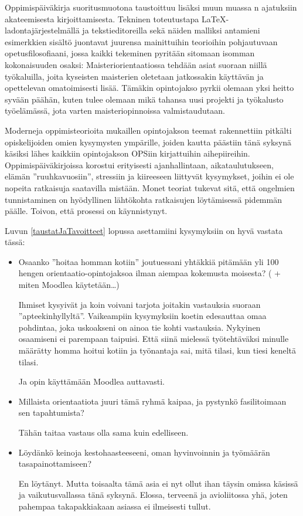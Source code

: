 \documentclass[utf8]{gradu3}
\begin{document}
Oppimispäiväkirja suoritusmuotona taustoittuu lisäksi muun muassa
\citeauthor{Badley2009shapingAndReshaping}n
\parencite*{Badley2009shapingAndReshaping} ajatuksiin akateemisesta
kirjoittamisesta. Tekninen toteutustapa \LaTeX -ladontajärjestelmällä ja
tekstieditoreilla sekä näiden malliksi antamieni esimerkkien sisältö juontavat
juurensa mainittuihin teorioihin pohjautuvaan opetusfilosofiaani, jossa kaikki
tekeminen pyritään sitomaan isomman kokonaisuuden osaksi: Maisteriorientaatiossa
tehdään asiat suoraan niillä työkaluilla, joita kyseisten maisterien oletetaan
jatkossakin käyttävän ja opettelevan omatoimisesti lisää. Tämäkin opintojakso
pyrkii olemaan yksi heitto syvään päähän, kuten tulee olemaan mikä tahansa uusi
projekti ja työkalusto työelämässä, jota varten maisteriopinnoissa
valmistaudutaan.

Moderneja oppimisteorioita mukaillen opintojakson teemat rakennettiin pitkälti
opiskelijoiden omien kysymysten ympärille, joiden kautta päästiin tänä syksynä
käsiksi lähes kaikkiin opintojakson OPSiin kirjattuihin aihepiireihin.
Oppimispäiväkirjoissa korostui erityisesti ajanhallintaan, aikataulutukseen,
elämän ''ruuhkavuosiin'', stressiin ja kiireeseen liittyvät kysymykset, joihin
ei ole nopeita ratkaisuja saatavilla mistään. Monet teoriat \parencite[edelleen
erityisesti][]{Illeris2009contemporaryTheories} tukevat sitä, että ongelmien
tunnistaminen on hyödyllinen lähtökohta ratkaisujen löytämisessä pidemmän
päälle. Toivon, että prosessi on käynnistynyt.

Luvun \ref{taustatJaTavoitteet} lopussa asettamiini kysymyksiin on hyvä vastata
tässä:

\begin{itemize}
\item Osaanko ”hoitaa homman kotiin” joutuessani yhtäkkiä pitämään yli 100
  hengen orientaatio-opintojaksoa ilman aiempaa kokemusta moisesta? ( + miten
  Moodlea käytetään…)

  Ihmiset kysyivät ja koin voivani tarjota joitakin vastauksia suoraan
  ''apteekinhyllyltä''. Vaikeampiin kysymyksiin koetin edesauttaa omaa
  pohdintaa, joka uskoakseni on ainoa tie kohti vastauksia. Nykyinen osaamiseni
  ei parempaan taipuisi. Että siinä mielessä työtehtäväksi minulle määrätty
  homma hoitui kotiin ja työnantaja sai, mitä tilasi, kun tiesi keneltä tilasi.

  Ja opin käyttämään Moodlea auttavasti.
 
\item Millaista orientaatiota juuri tämä ryhmä kaipaa, ja pystynkö fasilitoimaan
  sen tapahtumista?

  Tähän taitaa vastaus olla sama kuin edelliseen.

\item Löydänkö keinoja kestohaasteeseeni, oman hyvinvoinnin ja työmäärän
  tasapainottamiseen?

  En löytänyt. Mutta toisaalta tämä asia ei nyt ollut ihan täysin omissa käsissä
  ja vaikutusvallassa tänä syksynä. Elossa, terveenä ja avioliitossa yhä, joten
  pahempaa takapakkiakaan asiassa ei ilmeisesti tullut.
\end{itemize}
\end{document}
